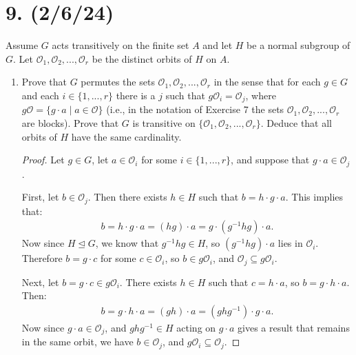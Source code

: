 \documentclass{article}
\begin{document}
\section*{9. (2/6/24)}

Assume $G$ acts transitively on the finite set $A$ and let $H$ be a normal subgroup of $G$. Let $\mathcal{O}_1, \mathcal{O}_2, ..., \mathcal{O}_r$ be the distinct orbits of $H$ on $A$.

\begin{enumerate}[itemsep=0em, label=(\alph*)]
    \item Prove that $G$ permutes the sets $\mathcal{O}_1, \mathcal{O}_2, ..., \mathcal{O}_r$ in the sense that for each $g \in G$ and each $i \in \{ 1, ..., r \}$ there is a $j$ such that $g\mathcal{O}_i = \mathcal{O}_j$, where $g\mathcal{O} = \{ g \cdot a \mid a \in \mathcal{O} \}$ (i.e., in the notation of Exercise 7 the sets $\mathcal{O}_1, \mathcal{O}_2, ..., \mathcal{O}_r$ are blocks). Prove that $G$ is transitive on $\{ \mathcal{O}_1, \mathcal{O}_2, ..., \mathcal{O}_r \}$. Deduce that all orbits of $H$ have the same cardinality.
        \begin{proof}
            Let $g \in G$, let $a \in \mathcal{O}_i$ for some $i \in \{ 1, ..., r \}$, and suppose that $g \cdot a \in \mathcal{O}_j$.

            First, let $b \in \mathcal{O}_j$. Then there exists $h \in H$ such that $b = h \cdot g \cdot a$. This implies that:
            \begin{align*}
                b = h \cdot g \cdot a = (hg) \cdot a = g \cdot (g^{-1}hg) \cdot a.
            \end{align*}
            Now since $H \unlhd G$, we know that $g^{-1}hg \in H$, so $(g^{-1}hg) \cdot a$ lies in $\mathcal{O}_i$. Therefore $b = g \cdot c$ for some $c \in \mathcal{O}_i$, so $b \in g\mathcal{O}_i$, and $\mathcal{O}_j \subseteq g\mathcal{O}_i$.

            Next, let $b = g \cdot c \in g\mathcal{O}_i$. There exists $h \in H$ such that $c = h \cdot a$, so $b = g \cdot h \cdot a$. Then:
            \begin{align*}
                b = g \cdot h \cdot a = (gh) \cdot a = (ghg^{-1}) \cdot g \cdot a.
            \end{align*}
            Now since $g \cdot a \in \mathcal{O}_j$, and $ghg^{-1} \in H$ acting on $g \cdot a$ gives a result that remains in the same orbit, we have $b \in \mathcal{O}_j$, and $g\mathcal{O}_i \subseteq \mathcal{O}_j$.


\end{proof}
\end{enumerate}
\end{document}
